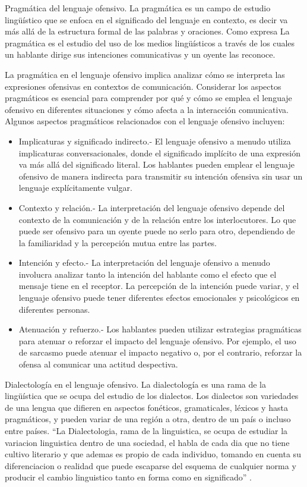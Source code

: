 Pragmática del lenguaje ofensivo. La pragmática es un campo de estudio lingüístico que se enfoca en el significado del lenguaje en contexto, es decir va más allá de la estructura formal de las palabras y oraciones. Como expresa  La pragmática es el estudio del uso de los medios lingüísticos a través de los cuales un hablante dirige sus intenciones comunicativas y un oyente las reconoce.
	
La pragmática en el lenguaje ofensivo implica analizar cómo se interpreta las expresiones ofensivas en contextos de comunicación. Considerar los aspectos pragmáticos es esencial para comprender por qué y cómo se emplea el lenguaje ofensivo en diferentes situaciones y cómo afecta a la interacción comunicativa. Algunos aspectos pragmáticos relacionados con el lenguaje ofensivo incluyen:

\begin{itemize}
		\item Implicaturas y significado indirecto.- El lenguaje ofensivo a menudo utiliza implicaturas conversacionales, donde el significado implícito de una expresión va más allá del significado literal. Los hablantes pueden emplear el lenguaje ofensivo de manera indirecta para transmitir su intención ofensiva sin usar un lenguaje explícitamente vulgar.
		
		\item Contexto y relación.- La interpretación del lenguaje ofensivo depende del contexto de la comunicación y de la relación entre los interlocutores. Lo que puede ser ofensivo para un oyente puede no serlo para otro, dependiendo de la familiaridad y la percepción mutua entre las partes.
		
		\item Intención y efecto.- La interpretación del lenguaje ofensivo a menudo involucra analizar tanto la intención del hablante como el efecto que el mensaje tiene en el receptor. La percepción de la intención puede variar, y el lenguaje ofensivo puede tener diferentes efectos emocionales y psicológicos en diferentes personas.
		
		\item Atenuación y refuerzo.- Los hablantes pueden utilizar estrategias pragmáticas para atenuar o reforzar el impacto del lenguaje ofensivo. Por ejemplo, el uso de sarcasmo puede atenuar el impacto negativo o, por el contrario, reforzar la ofensa al comunicar una actitud despectiva.
\end{itemize}

Dialectología en el lenguaje ofensivo. La dialectología es una rama de la lingüística que se ocupa del estudio de los dialectos. Los dialectos son variedades de una lengua que difieren en aspectos fonéticos, gramaticales, léxicos y hasta pragmáticos, y pueden variar de una región a otra, dentro de un país o incluso entre países. ``La Dialectologia, rama de la linguistica, se ocupa de estudiar la variacion linguistica dentro de una sociedad, el habla de cada dia que no tiene cultivo literario y que ademas es propio de cada individuo, tomando en cuenta su diferenciacion o realidad que puede escaparse del esquema de cualquier norma y producir el cambio linguistico tanto en forma como en significado'' \cite[p. 20]{prado2004analisis}.

